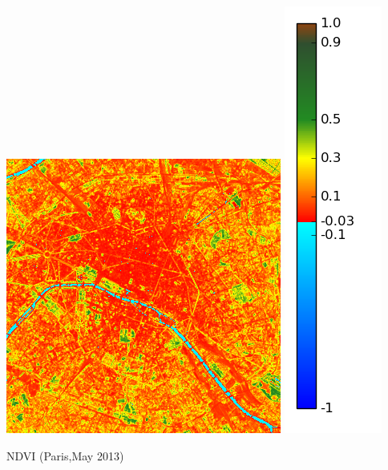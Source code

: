 \documentclass[c]{beamer}
\begin{document}
\begin{frame}
\begin{columns}
\begin{column}{0.33\textwidth}
  \begin{overlayarea}{\linewidth}{2cm}
  \centering\vfill
  \centerline{
  \includegraphics[scale=0.15]{images/Paris/05_ndvi.png}
  \includegraphics[scale=0.13]{images/colormap.png}
  }
  \end{overlayarea}
  \begin{overlayarea}{\linewidth}{0.5cm}
  \centering
  \tiny NDVI (Paris,May 2013) \par
  \end{overlayarea}

\end{column}
\end{columns}
\end{frame}
\end{document}
